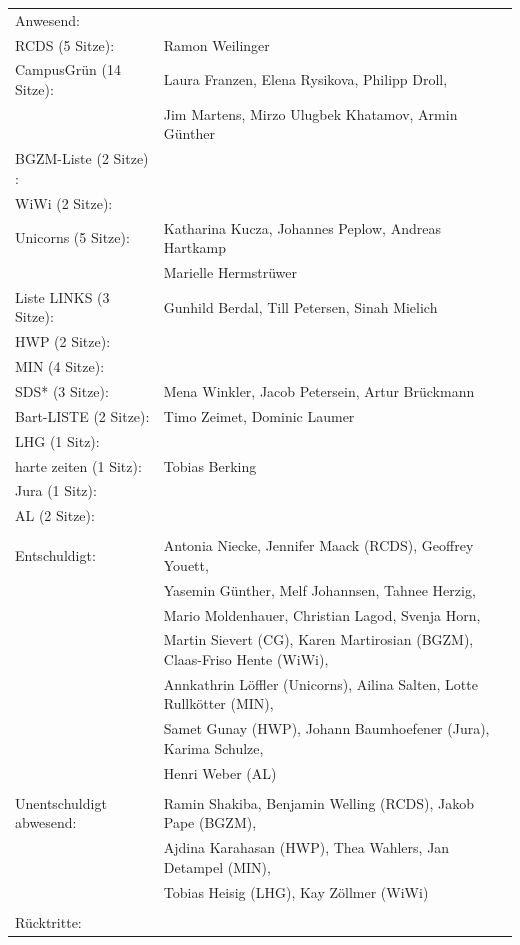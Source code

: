 \documentclass[ngerman,headheight=70pt]{scrartcl}
\begin{document}
    \begin{tabular}{ll}
        Anwesend: & \\
            RCDS (5 Sitze): & Ramon Weilinger \\
             CampusGrün (14 Sitze): & Laura Franzen, Elena Rysikova, Philipp Droll, \\
                                   & Jim Martens, Mirzo Ulugbek Khatamov, Armin Günther \\
             BGZM-Liste (2 Sitze) : & \\
             WiWi (2 Sitze): & \\
             Unicorns (5 Sitze): & Katharina Kucza, Johannes Peplow, Andreas Hartkamp \\
                                 & Marielle Hermstrüwer \\
             Liste LINKS (3 Sitze): & Gunhild Berdal, Till Petersen, Sinah Mielich \\
             HWP (2 Sitze): &  \\
             MIN (4 Sitze): & \\
             SDS* (3 Sitze): & Mena Winkler, Jacob Petersein, Artur Brückmann \\
             Bart-LISTE (2 Sitze): & Timo Zeimet, Dominic Laumer \\
             LHG (1 Sitz): & \\
             harte zeiten (1 Sitz): & Tobias Berking \\
             Jura (1 Sitz): & \\
             AL (2 Sitze): & \\
            & \\
        Entschuldigt: & Antonia Niecke, Jennifer Maack (RCDS), Geoffrey Youett,\\
                      & Yasemin Günther, Melf Johannsen, Tahnee Herzig, \\
                      & Mario Moldenhauer, Christian Lagod, Svenja Horn, \\
                      & Martin Sievert (CG), Karen Martirosian (BGZM), Claas-Friso Hente (WiWi), \\
                      & Annkathrin Löffler (Unicorns), Ailina Salten, Lotte Rullkötter (MIN), \\
                      & Samet Gunay (HWP), Johann Baumhoefener (Jura), Karima Schulze,\\
                      & Henri Weber (AL) \\
                      &\\
        Unentschuldigt abwesend: & Ramin Shakiba, Benjamin Welling (RCDS), Jakob Pape (BGZM), \\
                                & Ajdina Karahasan (HWP), Thea Wahlers, Jan Detampel (MIN), \\
                                & Tobias Heisig (LHG), Kay Zöllmer (WiWi)\\
                                &\\
        Rücktritte: & \\
    \end{tabular}
\end{document}
